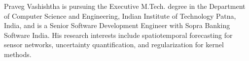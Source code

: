 \documentclass[journal,twoside,web]{ieeecolor}
\begin{document}



\begin{IEEEbiographynophoto}{Praveg Vashishtha}
is pursuing the Executive M.Tech. degree in the Department of Computer Science and Engineering,
Indian Institute of Technology Patna, India, and is a Senior Software Development Engineer with Sopra
Banking Software India. His research interests include spatiotemporal forecasting for sensor
networks, uncertainty quantification, and regularization for kernel methods.
\end{IEEEbiographynophoto}
\end{document}
